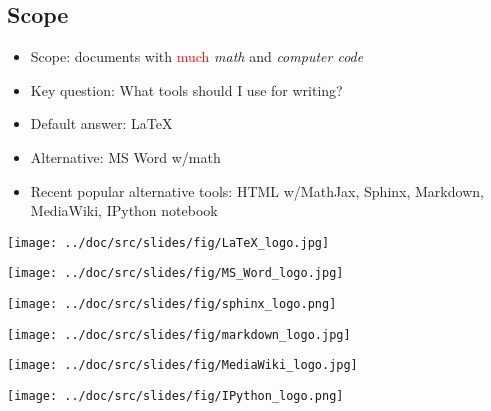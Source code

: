 \documentclass[%
oneside,                 %
final,                   %
10pt]{article}
\begin{document}
\subsection{Scope}
\begin{itemize}
  \item Scope: documents with \textcolor{red}{much} \emph{math} and \emph{computer code}
  \item Key question: What tools should I use for writing?
  \item Default answer: {\LaTeX}
  \item Alternative: MS Word w/math
  \item Recent popular alternative tools: HTML w/MathJax,
    Sphinx, Markdown, MediaWiki, IPython notebook
\end{itemize}
\noindent
\vspace{6mm}
\centerline{\texttt{[image: ../doc/src/slides/fig/LaTeX\_logo.jpg]}}
\vspace{6mm}
\vspace{6mm}
\centerline{\texttt{[image: ../doc/src/slides/fig/MS\_Word\_logo.jpg]}}
\vspace{6mm}
\vspace{6mm}
\centerline{\texttt{[image: ../doc/src/slides/fig/sphinx\_logo.png]}}
\vspace{6mm}
\vspace{6mm}
\centerline{\texttt{[image: ../doc/src/slides/fig/markdown\_logo.jpg]}}
\vspace{6mm}
\vspace{6mm}
\centerline{\texttt{[image: ../doc/src/slides/fig/MediaWiki\_logo.jpg]}}
\vspace{6mm}
\vspace{6mm}
\centerline{\texttt{[image: ../doc/src/slides/fig/IPython\_logo.png]}}
\vspace{6mm}
\end{document}
